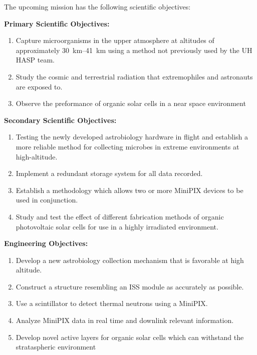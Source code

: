 \noindent The upcoming mission has the following scientific objectives:

\noindent \textbf {Primary Scientific Objectives:}
\begin{enumerate}
\item Capture microorganisms in the upper atmosphere at altitudes of approximately \SIrange{30}{41}{\kilo\meter} using a method not previously used by the UH HASP team. 
\item Study the cosmic and terrestrial radiation that extremophiles and astronauts are exposed to.
\item Observe the preformance of organic solar cells in a near space environment
\end{enumerate}

\noindent \textbf {Secondary Scientific Objectives:}
\begin{enumerate}
\item Testing the newly developed astrobiology hardware in flight and establish a more reliable method for collecting microbes in extreme environments at high-altitude.
\item Implement a redundant storage system for all data recorded.
\item Establish a methodology which allows two or more MiniPIX devices to be used in conjunction.
\item Study and test the effect of different fabrication methods of organic photovoltaic solar cells for use in a highly irradiated environment.
\end{enumerate}

\noindent \textbf {Engineering Objectives:}
\begin{enumerate}
\item Develop a new astrobiology collection mechanism that is favorable at high altitude.
\item Construct a structure resembling an ISS module as accurately as possible.
\item Use a scintillator to detect thermal neutrons using a MiniPIX.
\item Analyze MiniPIX data in real time and downlink relevant information.
\item Develop novel active layers for organic solar cells which can withstand the strataspheric environment
\end{enumerate}


